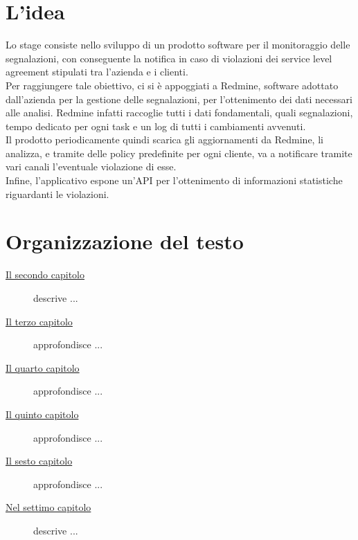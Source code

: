 \section{L'idea}

Lo stage consiste nello sviluppo di un prodotto software per il monitoraggio delle segnalazioni, con conseguente la notifica in caso di violazioni dei service level agreement stipulati tra l'azienda e i clienti.\\
Per raggiungere tale obiettivo, ci si è appoggiati a Redmine, software adottato dall'azienda per la gestione delle segnalazioni, per l'ottenimento dei dati necessari alle analisi. Redmine infatti raccoglie tutti i dati fondamentali, quali segnalazioni, tempo dedicato per ogni task e un log di tutti i cambiamenti avvenuti. \\
Il prodotto periodicamente quindi scarica gli aggiornamenti da Redmine, li analizza, e tramite delle policy predefinite per ogni cliente, va a notificare tramite vari canali l'eventuale violazione di esse. \\
Infine, l'applicativo espone un'API per l'ottenimento di informazioni statistiche riguardanti le violazioni. 

\section{Organizzazione del testo}

\begin{description}
    \item[{\hyperref[cap:processi-metodologie]{Il secondo capitolo}}] descrive ...
    
    \item[{\hyperref[cap:descrizione-stage]{Il terzo capitolo}}] approfondisce ...
    
    \item[{\hyperref[cap:analisi-requisiti]{Il quarto capitolo}}] approfondisce ...
    
    \item[{\hyperref[cap:progettazione-codifica]{Il quinto capitolo}}] approfondisce ...
    
    \item[{\hyperref[cap:verifica-validazione]{Il sesto capitolo}}] approfondisce ...
    
    \item[{\hyperref[cap:conclusioni]{Nel settimo capitolo}}] descrive ...
\end{description}

